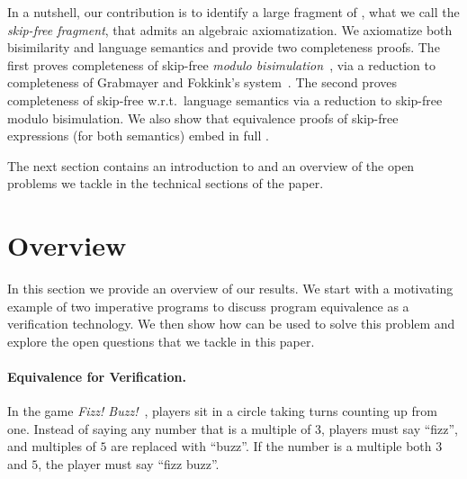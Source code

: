 \documentclass[orivec,envcountsect,envcountsame]{llncs}
\begin{document}


    In a nutshell, our contribution is to identify a large fragment of \GKAT, what we call the \emph{skip-free fragment}, that admits an algebraic axiomatization.
    We axiomatize both bisimilarity and language semantics and provide two completeness proofs.
    The first proves completeness of skip-free \GKAT \emph{modulo bisimulation}~\cite{gkaticalp}, via a reduction to completeness of Grabmayer and Fokkink's system~\cite{onefreeregexlics}.
    The second proves completeness of skip-free \GKAT w.r.t.\ language semantics via a reduction to skip-free \GKAT modulo bisimulation.
    We also show that equivalence proofs of skip-free \GKAT expressions (for both semantics) embed in full \GKAT. %

    The next section contains an introduction to \GKAT and an overview of the open problems we tackle in the technical sections of the paper.


\section{Overview}\label{sec:overview}
    In this section we provide an overview of our results. We start with a motivating example of two imperative programs to discuss program equivalence as a verification technology. We then show how \GKAT can be used to solve this problem and explore the open questions that we tackle in this paper.

    \paragraph{\bf Equivalence for Verification. }
    In the game \emph{Fizz! Buzz!}~\cite{fizzbuzz}, players sit in a circle taking turns counting up from one.
    Instead of saying any number that is a multiple of \(3\), players must say ``fizz'', and multiples of \(5\) are replaced with ``buzz''.
    If the number is a multiple both \(3\) and \(5\), the player must say ``fizz buzz''.%
\end{document}

